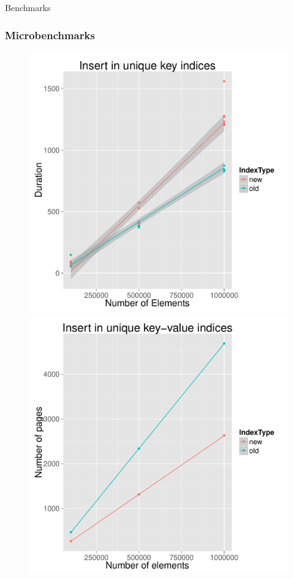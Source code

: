 \documentclass{beamer}
\begin{document}
  \begin{section}{Benchmarks}
    \begin{frame}
      \frametitle{Microbenchmarks}
      \begin{figure}
        \includegraphics[scale=0.28]{images/unique_random_insert.pdf}
        \quad
        \pause
        \includegraphics[scale=0.28]{images/nonUnique_random_insert_nodes.pdf}

\end{figure}
\end{frame}
\end{section}
\end{document}
